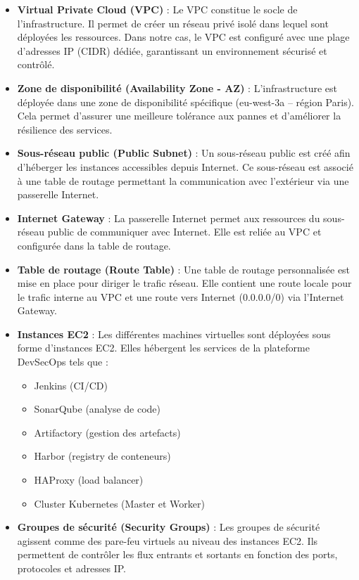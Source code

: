 \begin{itemize}
    \item \textbf{Virtual Private Cloud (VPC)} : Le VPC constitue le socle de l’infrastructure. Il permet de créer un réseau privé isolé dans lequel sont déployées les ressources. Dans notre cas, le VPC est configuré avec une plage d’adresses IP (CIDR) dédiée, garantissant un environnement sécurisé et contrôlé.

    \item \textbf{Zone de disponibilité (Availability Zone - AZ)} : L’infrastructure est déployée dans une zone de disponibilité spécifique (eu-west-3a – région Paris). Cela permet d’assurer une meilleure tolérance aux pannes et d’améliorer la résilience des services.

    \item \textbf{Sous-réseau public (Public Subnet)} : Un sous-réseau public est créé afin d’héberger les instances accessibles depuis Internet. Ce sous-réseau est associé à une table de routage permettant la communication avec l’extérieur via une passerelle Internet.

    \item \textbf{Internet Gateway} : La passerelle Internet permet aux ressources du sous-réseau public de communiquer avec Internet. Elle est reliée au VPC et configurée dans la table de routage.

    \item \textbf{Table de routage (Route Table)} : Une table de routage personnalisée est mise en place pour diriger le trafic réseau. Elle contient une route locale pour le trafic interne au VPC et une route vers Internet (0.0.0.0/0) via l’Internet Gateway.

    \item \textbf{Instances EC2} : Les différentes machines virtuelles sont déployées sous forme d’instances EC2. Elles hébergent les services de la plateforme DevSecOps tels que :
    \begin{itemize}
        \item Jenkins (CI/CD)
        \item SonarQube (analyse de code)
        \item Artifactory (gestion des artefacts)
        \item Harbor (registry de conteneurs)
        \item HAProxy (load balancer)
        \item Cluster Kubernetes (Master et Worker)
    \end{itemize}

    \item \textbf{Groupes de sécurité (Security Groups)} : Les groupes de sécurité agissent comme des pare-feu virtuels au niveau des instances EC2. Ils permettent de contrôler les flux entrants et sortants en fonction des ports, protocoles et adresses IP.

\end{itemize}

